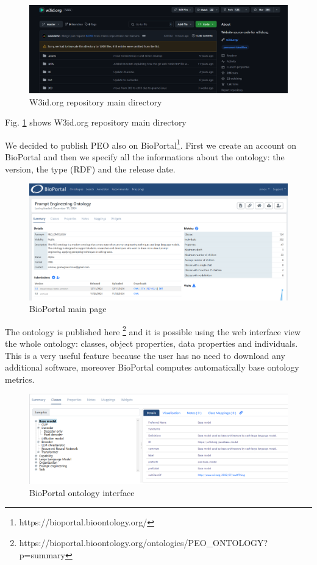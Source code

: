 \begin{figure}[H]
    \centering
    \includegraphics[width=0.9\linewidth]{Figures/fig_66.png}
    \caption{W3id.org repository main directory}
    \label{fig:66}
\end{figure}
Fig. \ref{fig:66} shows W3id.org repository main directory

We decided to publish PEO also on BioPortal\footnote{https://bioportal.bioontology.org/
}. First we create an account on BioPortal and then we specify all the informations about the ontology: the version, the type (RDF) and the release date.
\begin{figure}[H]
    \centering
    \includegraphics[width=0.9\linewidth]{Figures/fig_67.png}
    \caption{BioPortal main page}
    \label{fig:enter-label}
\end{figure}
The ontology is published here \footnote{https://bioportal.bioontology.org/ontologies/PEO_ONTOLOGY?p=summary} and it is possible using the web interface view the whole ontology: classes, object properties, data properties and individuals. This is a very useful feature because the user has no need to download any additional software, moreover BioPortal computes automatically base ontology metrics. 
\begin{figure}[H]
    \centering
    \includegraphics[width=0.9\linewidth]{Figures/fig_68.png}
    \caption{BioPortal ontology interface}
    \label{fig:enter-label}
\end{figure}


